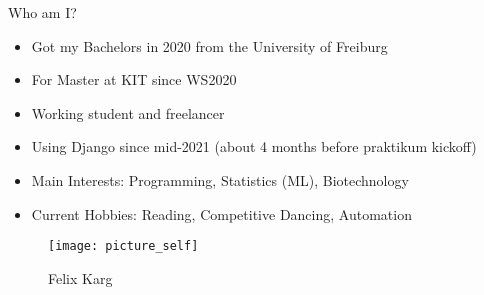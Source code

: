 \begin{frame}[c]{Who am I?}
    \begin{multicols}{2}
        \begin{itemize}[<+(1)->]
            \item Got my Bachelors in 2020 from the University of Freiburg
            \item For Master at KIT since WS2020
            \item Working student and freelancer
            \item Using Django since mid-2021 (about 4 months before praktikum kickoff)
            \item Main Interests: Programming, Statistics (ML), Biotechnology
            \item Current Hobbies: Reading, Competitive Dancing, Automation
        \end{itemize}
        \begin{figure}
        \texttt{[image: picture\_self]} \\
        \caption*{Felix Karg}
        \end{figure}
    \end{multicols}
\end{frame}


\iftwocols

\begin{frame}[c,plain]%
    \begin{minipage}{22em}
    \begin{multicols}{2}
    \tableofcontents[hideallsubsections]
    \end{multicols}
    \end{minipage}
\end{frame}

\else

\begin{frame}[c,plain]%
    \begin{minipage}{22em}
    \tableofcontents[hideallsubsections]
    \end{minipage}
\end{frame}
\fi


\newcommand{\pic}[2]{
\begin{frame}[c]{#1}
    \texttt{[image: Selection\_0\#2]}
\end{frame}
}

\newcommand{\p}[1]{{\color{ForestGreen}+#1}}
\newcommand{\m}[1]{{\color{red}-#1}}
